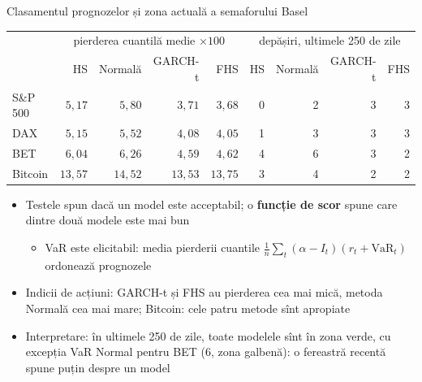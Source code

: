 \begin{frame}{Clasamentul prognozelor și zona actuală a semaforului Basel}
\itemsize{\footnotesize}
\begin{center}
\footnotesize
\begin{tabular}{l|rrrr|rrrr}
\toprule
& \multicolumn{4}{c|}{pierderea cuantilă medie $\times 100$} & \multicolumn{4}{c}{depășiri, ultimele 250 de zile} \\ & HS & Normală & GARCH-t & FHS & HS & Normală & GARCH-t & FHS \\
\midrule
S\&P 500 & $5{,}17$ & $5{,}80$ & $3{,}71$ & $3{,}68$ & 0 & 2 & 3 & 3 \\
DAX & $5{,}15$ & $5{,}52$ & $4{,}08$ & $4{,}05$ & 1 & 3 & 3 & 3 \\
BET & $6{,}04$ & $6{,}26$ & $4{,}59$ & $4{,}62$ & 4 & 6 & 3 & 2 \\
Bitcoin & $13{,}57$ & $14{,}52$ & $13{,}53$ & $13{,}75$ & 3 & 4 & 2 & 2 \\
\bottomrule
\end{tabular}
\end{center}
\begin{itemize}
    \item Testele spun dacă un model este acceptabil; o \textbf{funcție de scor} spune care dintre două modele este mai bun
    \begin{itemize}
        \item VaR este elicitabil: media pierderii cuantile $\frac1n\sum_t(\alpha - I_t)(r_t + \mathrm{VaR}_t)$ ordonează prognozele 
    \end{itemize}
    \item Indicii de acțiuni: GARCH-t și FHS au pierderea cea mai mică, metoda Normală cea mai mare; Bitcoin: cele patru metode sînt apropiate
    \item Interpretare: în ultimele 250 de zile, toate modelele sînt în zona verde, cu excepția VaR Normal pentru BET (6, zona galbenă): o fereastră recentă spune puțin despre un model
\end{itemize}
\end{frame}

